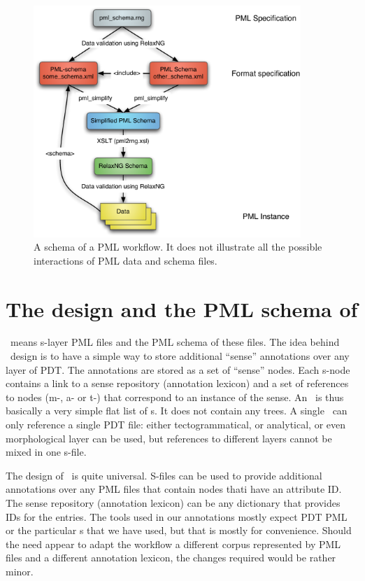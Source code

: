 \begin{figure}[htbp]
   \centering
   \includegraphics[width=0.9\textwidth]{images/pml-schema.pdf}
   \caption{A schema of a PML workflow. It does not illustrate all the possible interactions of PML data and schema files.}
   \label{fig:pml}
\end{figure}


\section{The design and the PML schema of \sdata}
\label{sec:s:design}
\sdata\ means s-layer PML files and the PML schema of these files. The idea behind \sdata\ design is to have a simple way to store additional ``sense'' annotations over any layer of PDT. The annotations are stored as a set of ``sense'' nodes. Each s-node contains a link to a sense repository (annotation lexicon) and a set of references to nodes (m-, a- or t-) that correspond to an instance of the sense. An \sf\ is thus basically a very simple flat list of \sn{}s. It does not contain any trees. A single \sf\ can only reference a single PDT file: either tectogrammatical, or analytical, or even morphological layer can be used, but references to different layers cannot be mixed in one s-file.

The design of \sdata\ is quite universal. S-files can be used to provide additional annotations over any PML files that contain nodes thati have an attribute ID. The sense repository (annotation lexicon) can be any dictionary that provides IDs for the entries. The tools used in our annotations mostly expect PDT PML or the particular \sf{}s that we have used, but that is mostly for convenience. Should the need appear to adapt the workflow a different corpus represented by PML files and a different annotation lexicon, the changes required would be rather minor.


